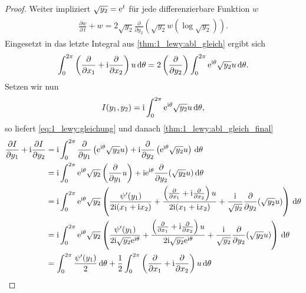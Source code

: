 \begin{proof}
Weiter impliziert $\sqrt{y_2}=\mathrm e^t$ für jede differenzierbare Funktion $w$
\begin{align}\label{thm:1_lewy:int_gleichheit1}
\begin{split}
\frac{\partial w}{\partial\, t}+ w  = 2\sqrt{y_2} \frac{\partial}{\partial y_2} \left( \sqrt{y_2} w(\log\sqrt{y_2})\right).
\end{split}
\end{align}
Eingesetzt in das letzte Integral aus \eqref{thm:1_lewy:abl_gleich} ergibt sich
\begin{align}\label{thm:1_lewy:abl_gleich_final}
\begin{split}
\int_0^{2\pi} \left(\frac{\partial}{\partial x_1} +\mathrm i\frac{\partial}{\partial x_2}\right)u\,\mathrm d\theta 
= 2\left(\frac{\partial}{\partial y_2}\right)\int_0^{2\pi} \mathrm e^{\mathrm i\theta}\sqrt{y_2}u\,\mathrm d\theta.
\end{split}
\end{align}
Setzen wir nun 
\begin{equation}
I(y_1,y_2)=\mathrm i\int_0^{2\pi} \mathrm e^{\mathrm i\theta} \sqrt{y_2} u\,\mathrm d\theta,
\end{equation}
so liefert \eqref{eq:1_lewy:gleichung} und danach \eqref{thm:1_lewy:abl_gleich_final}
\begin{align}
\begin{split}
\frac{\partial I}{\partial y_1} +\i\frac{\partial I}{\partial y_2} 
&= \i\int_{0}^{2\pi} \frac{\partial}{\partial y_1}\left(\e^{\i\theta}\sqrt{y_2}u\right)+\i\frac{\partial}{\partial y_2}\left(\e^{\i\theta}\sqrt{y_2}u\right)\d\theta \\
&= \i\int_{0}^{2\pi} \e^{\i\theta}\sqrt{y_2}\left(\frac{\partial}{\partial y_1}u\right) +\i\e^{\i\theta}\frac{\partial}{\partial y_2}(\sqrt{y_2}u)\d\theta\\
&= \i\int_{0}^{2\pi} \e^{\i\theta}\sqrt{y_2} \left(
	\frac{\psi'(y_1)}{2\i(x_1+\i x_2)}
	+ \frac{\left(\frac{\partial}{\partial x_1} + \i\frac{\partial}{\partial x_2}\right)u}{2\i(x_1+\i x_2)} 
	+ \frac{\i}{\sqrt{y_2}} \frac{\partial}{\partial y_2}(\sqrt{y_2} u)
\right)\d\theta \\
&= \i\int_{0}^{2\pi} \e^{\i\theta}\sqrt{y_2} \left( 
	\frac{\psi'(y_1)}{2\i\sqrt{y_2}\e^{\i\theta}} 
	+ \frac{\left(\frac{\partial}{\partial x_1} + \i\frac{\partial}{\partial x_2}\right)u}{2\i\sqrt{y_2}\e^{\i\theta}}
	+ \frac{\i}{\sqrt{y_2}} \frac{\partial}{\partial y_2}(\sqrt{y_2} u)
\right)\d\theta	 \\
&= \int_0^{2\pi} \frac{\psi'(y_1)}{2}\d\theta 
	+ \frac{1}{2}\int_0^{2\pi} \left(\frac{\partial}{\partial x_1} +\i \frac{\partial}{\partial x_2}\right)u\d\theta

\end{split}
\end{align}
\end{proof}
